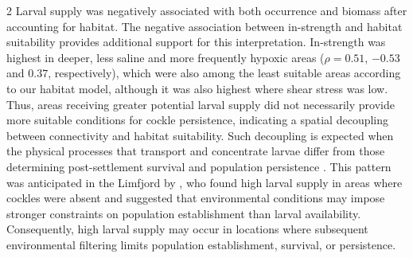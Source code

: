 \begin{spacing}{2}
Larval supply was negatively associated with both occurrence and biomass after accounting for habitat. The negative association between in-strength and habitat suitability provides additional support for this interpretation. In-strength was highest in deeper, less saline and more frequently hypoxic areas ($\rho = 0.51$, $-0.53$ and $0.37$, respectively), which were also among the least suitable areas according to our habitat model, although it was also highest where shear stress was low. Thus, areas receiving greater potential larval supply did not necessarily provide more suitable conditions for cockle persistence, indicating a spatial decoupling between connectivity and habitat suitability. Such decoupling is expected when the physical processes that transport and concentrate larvae differ from those determining post-settlement survival and population persistence \citep[e.g.][]{whiteScaleDependentChangesImportance2008}. This pattern was anticipated in the Limfjord by \citet{hansenAssessingDemographicConnectivity2024}, who found high larval supply in areas where cockles were absent and suggested that environmental conditions may impose stronger constraints on population establishment than larval availability. Consequently, high larval supply may occur in locations where subsequent environmental filtering limits population establishment, survival, or persistence.


\end{spacing}
